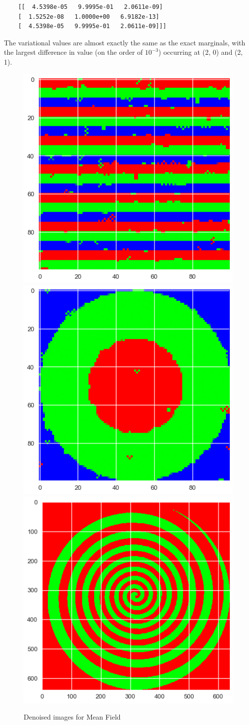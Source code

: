 \documentclass[submit]{harvardml}
\theoremstyle{plain}
\begin{document}
\begin{enumerate}
\begin{verbatim}
	[[  4.5398e-05   9.9995e-01   2.0611e-09]
	[  1.5252e-08   1.0000e+00   6.9182e-13]
	[  4.5398e-05   9.9995e-01   2.0611e-09]]]
	\end{verbatim}
	The variational values are almost exactly the same as the exact marginals, with the largest difference in value (on the order of $10^{-3}$) occurring at (2, 0) and (2, 1).
	\begin{figure}
		\centering
		\includegraphics[width=.3\textwidth]{flag_mf}
		\includegraphics[width=.3\textwidth]{bullseye_mf}
		\includegraphics[width=.3\textwidth]{spiral_mf}
		\caption{Denoised images for Mean Field}
		\label{1}
	\end{figure}


\end{enumerate}
\end{document}
